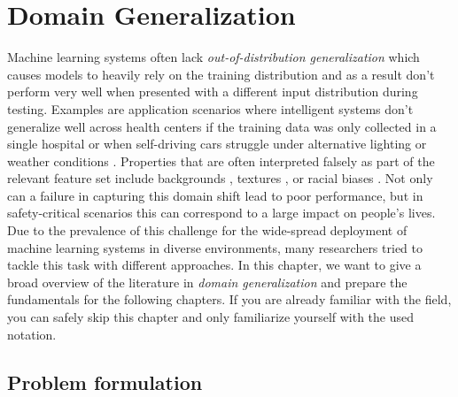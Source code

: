 \chapter{Domain Generalization} %
\label{DomainGeneralization} 

Machine learning systems often lack \emph{out-of-distribution generalization} which causes models to heavily rely on the training distribution and as a result don't perform very well when presented with a different input distribution during testing. Examples are application scenarios where intelligent systems don't generalize well across health centers if the training data was only collected in a single hospital \citep{Castro_2020, AlBadawy2018, PeroneBBC19} or when self-driving cars struggle under alternative lighting or weather conditions \citep{DaiG18, VolkMBH019}. Properties that are often interpreted falsely as part of the relevant feature set include backgrounds \citep{BeeryHP18}, textures \citep{GeirhosRMBWB19}, or racial biases \citep{StockC18}. Not only can a failure in capturing this domain shift lead to poor performance, but in safety-critical scenarios this can correspond to a large impact on people's lives. Due to the prevalence of this challenge for the wide-spread deployment of machine learning systems in diverse environments, many researchers tried to tackle this task with different approaches. In this chapter, we want to give a broad overview of the literature in \emph{domain generalization} and prepare the fundamentals for the following chapters. If you are already familiar with the field, you can safely skip this chapter and only familiarize yourself with the used notation.

\section{Problem formulation}
\label{sec:domain_gen_problem}

